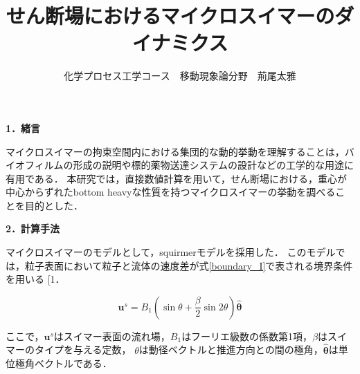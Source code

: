 \documentclass[twocolumns,10pt,a4j]{jarticle}
\title{\Large せん断場におけるマイクロスイマーのダイナミクス\vspace{-3truemm}}
\author{\large 化学プロセス工学コース　移動現象論分野　荊尾太雅\vspace{-10zh}}
\date{}
\makeatletter
\DeclareRobustCommand\cite{\unskip
  \@ifnextchar[{\@tempswatrue\@citex}{\@tempswafalse\@citex[]}}
\makeatother
\begin{document}



  \noindent
  \textbf{\large 1．緒言}
  \par
マイクロスイマーの拘束空間内における集団的な動的挙動を理解することは，バイオフィルムの形成の説明や標的薬物送達システムの設計などの工学的な用途に有用である．
本研究では，直接数値計算を用いて，せん断場における，重心が中心からずれたbottom heavyな性質を持つマイクロスイマーの挙動を調べることを目的とした．


  \noindent
  \textbf{\large 2．計算手法}
  \par
マイクロスイマーのモデルとして，squirmerモデルを採用した．
このモデルでは，粒子表面において粒子と流体の速度差が式\eqref{boundary_I}で表される境界条件を用いる\cite{1}．

  \vspace{-3truemm}
    \begin{equation}
      \boldsymbol{u}^s = B_1 \left( \sin{\theta} + \frac{\beta}{2} \sin{2\theta} \right) \hat{\boldsymbol{\theta}}
      \label{boundary_I}
    \end{equation}
  \vspace{-4truemm}

  \noindent
ここで，$\boldsymbol{u}^s$はスイマー表面の流れ場，$B_1$はフーリエ級数の係数第1項，$\beta$はスイマーのタイプを与える定数，
$\theta$は動径ベクトルと推進方向との間の極角，$\hat{\boldsymbol{\theta}}$は単位極角ベクトルである．
\end{document}
